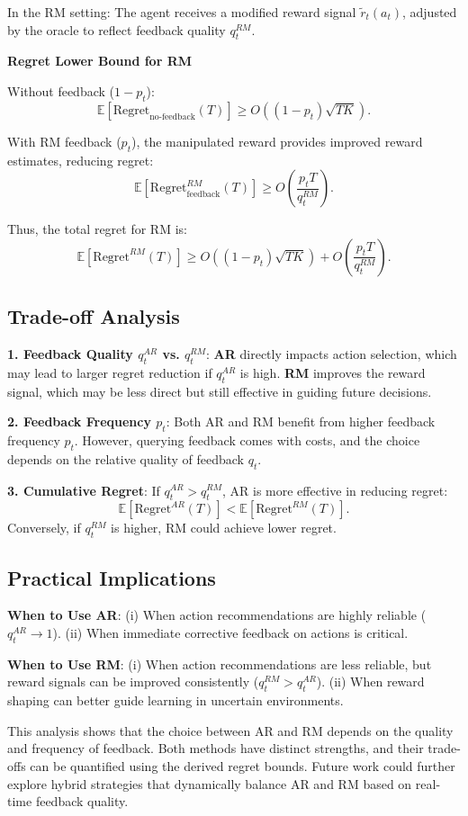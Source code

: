 In the RM setting: The agent receives a modified reward signal \( \tilde{r}_t(a_t) \), adjusted by the oracle to reflect feedback quality \( q_t^{RM} \).

\textbf{Regret Lower Bound for RM}

Without feedback (\( 1 - p_t \)):
\[
\mathbb{E}[\text{Regret}_{\text{no-feedback}}(T)] \geq O((1 - p_t) \sqrt{T K}).
\]

With RM feedback (\( p_t \)), the manipulated reward provides improved reward estimates, reducing regret:
\[
\mathbb{E}[\text{Regret}_{\text{feedback}}^{RM}(T)] \geq O\left(\frac{p_t T}{q_t^{RM}}\right).
\]

Thus, the total regret for RM is:
\[
\mathbb{E}[\text{Regret}^{RM}(T)] \geq O((1 - p_t) \sqrt{T K}) + O\left(\frac{p_t T}{q_t^{RM}}\right).
\]


\subsection{Trade-off Analysis}

\textbf{1. Feedback Quality \(q_t^{AR}\) vs. \(q_t^{RM}\)}:
   \textbf{AR} directly impacts action selection, which may lead to larger regret reduction if \(q_t^{AR}\) is high.
   \textbf{RM} improves the reward signal, which may be less direct but still effective in guiding future decisions.

\textbf{2. Feedback Frequency \(p_t\)}:
   Both AR and RM benefit from higher feedback frequency \(p_t\). However, querying feedback comes with costs, and the choice depends on the relative quality of feedback \(q_t\).

\textbf{3. Cumulative Regret}:
   If \(q_t^{AR} > q_t^{RM}\), AR is more effective in reducing regret:
     \[
     \mathbb{E}[\text{Regret}^{AR}(T)] < \mathbb{E}[\text{Regret}^{RM}(T)].
     \]
   Conversely, if \(q_t^{RM}\) is higher, RM could achieve lower regret.

\subsection{Practical Implications}
\textbf{When to Use AR}:
 (i) When action recommendations are highly reliable (\(q_t^{AR} \to 1\)).
 (ii) When immediate corrective feedback on actions is critical.

\textbf{When to Use RM}:
 (i) When action recommendations are less reliable, but reward signals can be improved consistently (\(q_t^{RM} > q_t^{AR}\)).
 (ii) When reward shaping can better guide learning in uncertain environments.


This analysis shows that the choice between AR and RM depends on the quality and frequency of feedback. Both methods have distinct strengths, and their trade-offs can be quantified using the derived regret bounds. Future work could further explore hybrid strategies that dynamically balance AR and RM based on real-time feedback quality.
